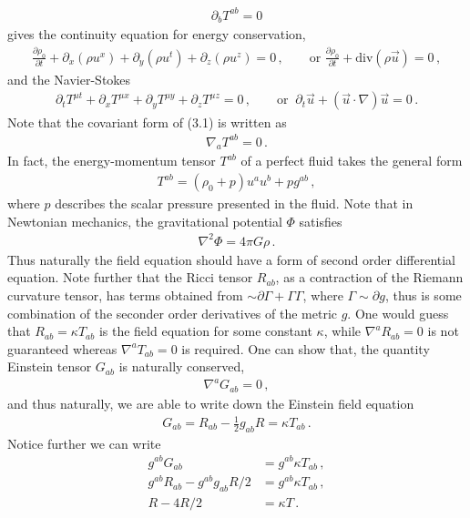 \documentclass[11pt, onesided]{book}
\theoremstyle{break}
\theoremstyle{break}
\newcommand{\pd}{\partial}
\begin{document}
\begin{align}
\pd_b T^{ab} = 0
\end{align}
gives the continuity equation for energy conservation,
\begin{align*}
\frac{\pd \rho_0}{\pd t} + \pd_x(\rho u^x) + \pd_y(\rho u^t)+ \pd_z(\rho u^z) = 0\,,\qquad \text{or }\frac{\pd \rho_0}{\pd t} + \text{div}(\rho \vec{u}) = 0\,,
\end{align*}
and the Navier-Stokes
\begin{align*}
\pd_t T^{\mu t} + \pd_x T^{\mu x} + \pd_y T^{\mu y} + \pd_z T^{\mu z} = 0\,,
\qquad \text{or }\ \pd_t \vec{u} + (\vec{u}\cdot \nabla) \vec{u} = 0\,.
\end{align*}
Note that the covariant form of (3.1) is written as
\begin{align*}
\nabla_a T^{ab } = 0\,.
\end{align*}
In fact, the energy-momentum tensor $T^{ab}$ of a perfect fluid takes the general form
\begin{align*}
T^{ab} = (\rho_0 +p)u^au^b + pg^{ab}\,,
\end{align*}
where $p$ describes the scalar pressure presented in the fluid. Note that in Newtonian mechanics, the gravitational potential $\Phi$ satisfies
\begin{align*}
\nabla^2 \Phi = 4\pi G\rho\,.
\end{align*}
Thus naturally the field equation should have a form of second order differential equation. Note further that the Ricci tensor $R_{ab}$, as a contraction of the Riemann curvature tensor, has terms obtained from $\sim \pd \Gamma + \Gamma\Gamma$, where $\Gamma\sim \pd g$, thus is some combination of the seconder order derivatives of the metric $g$. One would guess that $R_{ab} = \kappa T_{ab}$ is the field equation for some constant $\kappa$, while $\nabla^a R_{ab} = 0$ is not guaranteed whereas $\nabla^aT_{ab} = 0$ is required. One can show that, the quantity Einstein tensor $G_{ab}$ is naturally conserved,
\begin{align*}
\nabla^a G_{ab } =0\,,
\end{align*}
and thus naturally, we are able to write down the Einstein field equation
\begin{align}
G_{ab} = R_{ab} - \frac{1}{2}g_{ab}R = \kappa T_{ab}\,.
\end{align}
Notice further we can write
\begin{align*}
g^{ab}G_{ab} &=g^{ab} \kappa T_{ab}\,,\\
g^{ab}R_{ab} - g^{ab}g_{ab}R/2 &=g^{ab} \kappa T_{ab}\,,\\
R - 4R/2 &= \kappa T\,.
\end{align*}
\end{document}
